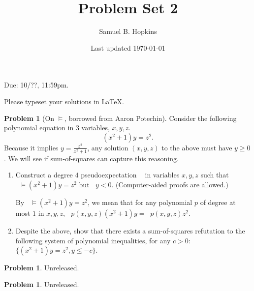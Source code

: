 \documentclass[11pt]{article}
\title{Problem Set 2}
\author{Samuel B. Hopkins}
\date{Last updated \today}
\theoremstyle{definition}
\newtheorem{problem}[theorem]{Problem}
\DeclareMathOperator{\pE}{\widetilde{\mathbb{E}}} %
\begin{document}
\maketitle

Due: 10/??, 11:59pm.

Please typeset your solutions in LaTeX.

\begin{problem}[On $\vDash$, borrowed from Aaron Potechin]

Consider the following polynomial equation in $3$ variables, $x,y,z$.
\[ (x^2 + 1) y = z^2. \]
Because it implies $y = \frac{z^2}{x^2+1}$, any solution $(x,y,z)$ to the above must have $y \ge 0$. We will see if sum-of-squares can capture this reasoning.

\begin{enumerate}
  \item Construct a degree $4$ pseudoexpectation $\pE$ in variables $x,y,z$ such that $\pE \vDash (x^2+1)y = z^2$ but $\pE y < 0$. (Computer-aided proofs are allowed.)

  By $\pE \vDash (x^2+1)y = z^2$, we mean that for any polynomial $p$ of degree at most $1$ in $x,y,z$, $\pE p(x,y,z)(x^2+1)y = \pE p(x,y,z)z^2$.

  \item Despite the above, show that there exists a sum-of-squares refutation to the following system of polynomial inequalities, for any $c > 0$: $\{ (x^2+1)y = z^2 , y \le -c \}$.
\end{enumerate}
\end{problem}

\begin{problem}
  Unreleased.
\end{problem}

\begin{problem}
  Unreleased.
\end{problem}
\end{document}
